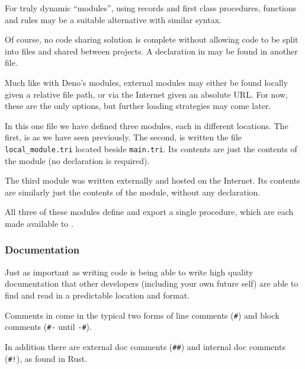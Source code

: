 For truly dynamic ``modules'', using records and first class procedures,
functions and rules may be a suitable alternative with similar syntax.

Of course, no code sharing solution is complete without allowing code
to be split into files and shared between projects. A  declaration
in \Trilogy{} may be found in another file.

Much like with Deno's modules, external modules may either be found locally
given a relative file path, or via the Internet given an absolute URL. For
now, these are the only options, but further loading strategies may come
later.


In this one file we have defined three modules, each in different locations.
The first,  is as we have seen previously. The second,
 is written the file \texttt{local\_module.tri} located
beside \texttt{main.tri}. Its contents are just the contents of the module
(no  declaration is required).


The third module was written externally and hosted on the Internet.
Its contents are similarly just the contents of the module, without
any declaration.


All three of these modules define and export a single procedure, which
are each made available to .

\subsubsection{Documentation}

Just as important as writing code is being able to write high quality
documentation that other developers (including your own future self)
are able to find and read in a predictable location and format.

Comments in \Trilogy{} come in the typical two forms of line comments
(\texttt{\#}) and block comments (\texttt{\#-} until \texttt{-\#}).

In addition there are external doc comments (\texttt{\#\#}) and internal
doc comments (\texttt{\#!}), as found in Rust.


